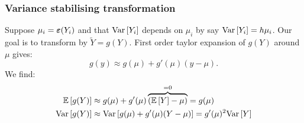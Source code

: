 \subsubsection{Variance stabilising transformation}


Suppose $\mu_i=\boldsymbol{\varepsilon}(Y_i)$ and that $\mathrm{Var}\left[Y_i\right]$ depends on $\mu_i$ by say $\mathrm{Var}\left[Y_i\right]=h{\mu_i}$. Our goal is to transform by $\tilde{Y} = g(Y)$. First order taylor expansion of $g(Y)$ around $\mu$ gives:
$$
    g(y) \approx g(\mu) + g'(\mu)(y-\mu).
$$ 
We find:
\begin{align*}
    \mathbb{E}\left[g(Y)\right] &\approx g(\mu) + g'(\mu)\overbrace{(\mathbb{E}\left[Y\right]-\mu )}^{=0} = g(\mu) 
    \\
    \mathrm{Var}\left[g(Y)\right] &\approx \mathrm{Var}\left[g(\mu) + g'(\mu)(Y-\mu)\right] = g'(\mu)^2\mathrm{Var}\left[Y\right] 
\end{align*}

